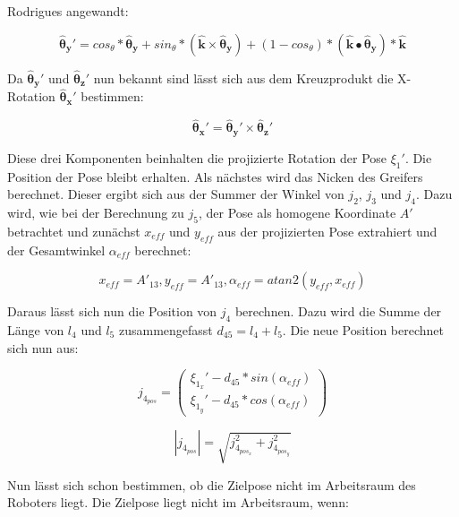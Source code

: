 Rodrigues angewandt:

\begin{equation}
\pmb{\hat{\theta}_y'} = cos_\theta * \pmb{\hat{\theta}_y} + sin_\theta * ( \pmb{\hat{k}} \times \pmb{\hat{\theta}_y}) + (1 - cos_\theta) * (\pmb{\hat{k}} \bullet \pmb{\hat{\theta}_y}) * \pmb{\hat{k}} 
\label{eq:25}
\end{equation}

Da $\pmb{\hat{\theta}_y'}$ und $\pmb{\hat{\theta}_z'} $ nun bekannt sind lässt sich aus dem Kreuzprodukt die X-Rotation $\pmb{\hat{\theta}_x'} $ bestimmen:

\begin{equation}
\pmb{\hat{\theta}_x'} = \pmb{\hat{\theta}_y'} \times \pmb{\hat{\theta}_z'}
\label{eq:26}
\end{equation}

Diese drei Komponenten beinhalten die projizierte Rotation der Pose $\xi_1'$. Die Position der Pose bleibt erhalten. Als nächstes wird das Nicken des Greifers berechnet. Dieser ergibt sich aus der Summer der Winkel von $j_2$, $j_3$ und $j_4$. Dazu wird, wie bei der Berechnung zu $j_5$, der Pose als homogene Koordinate $A'$ betrachtet und zunächst $x_{eff}$ und $y_{eff}$ aus der projizierten Pose extrahiert und der Gesamtwinkel $\alpha_{eff}$ berechnet:

\begin{equation}
x_{eff} = A'_{13}, y_{eff} = A'_{13}, \alpha_{eff} = atan2(y_{eff}, x_{eff})
\label{eq:28}
\end{equation}

Daraus lässt sich nun die Position von $j_4$ berechnen. Dazu wird die Summe der Länge von $l_4$ und $l_5$ zusammengefasst $d_{45} = l_4 + l_5$. Die neue Position berechnet sich nun aus:

\begin{equation}
j_{4_{pos}} = 
\left(\begin{array}{c} 
\xi_{1_x}' - d_{45} * sin(\alpha_{eff})\\
\xi_{1_y}' - d_{45} * cos(\alpha_{eff})
\end{array}\right)
\label{eq:29}
\end{equation}

\begin{equation}
|j_{4_{pos}}| = \sqrt{j_{4_{pos_x}}^2 + j_{4_{pos_y}}^2}
\label{eq:31}
\end{equation}

Nun lässt sich schon bestimmen, ob die Zielpose nicht im Arbeitsraum des Roboters liegt. Die Zielpose liegt nicht im Arbeitsraum, wenn:


